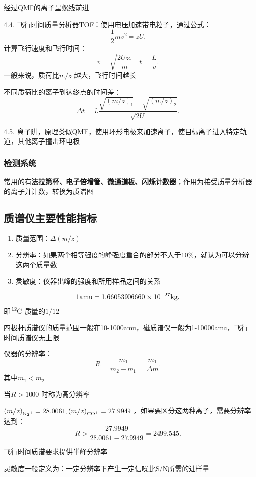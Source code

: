 \begin{notation}
    经过QMF的离子呈螺线前进
\end{notation}
4.4. 飞行时间质量分析器TOF：使用电压加速带电粒子，通过公式：\[
    \frac{1}{2}mv^2 = zU
.\]
计算飞行速度和飞行时间：
\[
    v = \sqrt{\frac{2Uze}{m}} \quad t = \frac{L}{v}
.\]
一般来说，质荷比$m / z$ 越大，飞行时间越长
\begin{notation}
    不同质荷比的离子到达终点的时间差：
    \[
        \Delta t = L \frac{\sqrt{\left( m / z \right)_1}-\sqrt{\left( m / z \right)_2}}{\sqrt{2U}}
    .\]
\end{notation}
4.5. 离子阱，原理类似QMF，使用环形电极来加速离子，使目标离子进入特定轨道，其他离子撞击环电极
\subsubsection{检测系统}%
\label{ssub*:检测系统}
常用的有\textbf{法拉第杯、电子倍增管、微通道板、闪烁计数器}；作用为接受质量分析器的离子并计数，转换为质谱图
\subsection{质谱仪主要性能指标}%
\label{sub:质谱仪主要性能指标}
\begin{enumerate}
    \item 质量范围：$\Delta\left( m / z \right)$
    \item 分辨率：如果两个相等强度的峰强度重合的部分不大于10\%，就认为可以分辨这两个质量数
    \item 灵敏度：仪器出峰的强度和所用样品之间的关系
    
\end{enumerate}
\begin{defi}
    \[
    1\text{amu} = 1.66053906660 \times 10^{-27} \ce{kg}
    .\]
    即$\ce{^12C}$ 质量的$1 / 12$
\end{defi}
\begin{notation}
    四极杆质谱仪的质量范围一般在10-1000amu，磁质谱仪一般为1-10000amu，飞行时间质谱仪无上限
\end{notation}
\begin{notation}
仪器的分辨率：\[
    R = \frac{m_1}{m_2-m_1} = \frac{m_1}{\Delta m}
.\]
其中$m_1<m_2$
\end{notation}
当$R>1000$ 时称为高分辨率
\begin{eg}
    $\left( m / z \right)_{\ce{N_2+}} = 28.0061, \left( m / z \right)_{\ce{CO+}} = 27.9949$ ，如果要区分这两种离子，需要分辨率达到：\[
        R > \frac{27.9949}{28.0061-27.9949} = 2499.545
    .\]
\end{eg}
\begin{notation}
    飞行时间质谱要求提供半峰分辨率
\end{notation}
\begin{notation}
    灵敏度一般定义为：一定分辨率下产生一定信噪比S/N所需的进样量
\end{notation}
